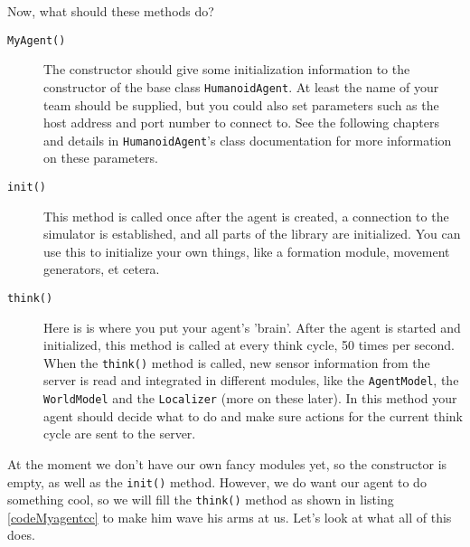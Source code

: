 Now, what should these methods do?
\begin{description}
\item[{\tt MyAgent()}] The constructor should give some initialization information to the constructor of the base class {\tt HumanoidAgent}. At least the name of your team should be supplied, but you could also set parameters such as the host address and port number to connect to. See the following chapters and details in {\tt HumanoidAgent}'s class documentation for more information on these parameters.
\item[{\tt init()}] This method is called once after the agent is created, a connection to the simulator is established, and all parts of the library are initialized. You can use this to initialize your own things, like a formation module, movement generators, et cetera.
\item[{\tt think()}] Here is is where you put your agent's 'brain'. After the agent is started and initialized, this method is called at every think cycle, 50 times per second. When the {\tt think()} method is called, new sensor information from the server is read and integrated in different modules, like the {\tt AgentModel}, the {\tt WorldModel} and the {\tt Localizer} (more on these later). In this method your agent should decide what to do and make sure actions for the current think cycle are sent to the server.
\end{description}

At the moment we don't have our own fancy modules yet, so the constructor is empty, as well as the {\tt init()} method. However, we do want our agent to do something cool, so we will fill the {\tt think()} method as shown in listing \ref{codeMyagentcc} to make him wave his arms at us. Let's look at what all of this does.

